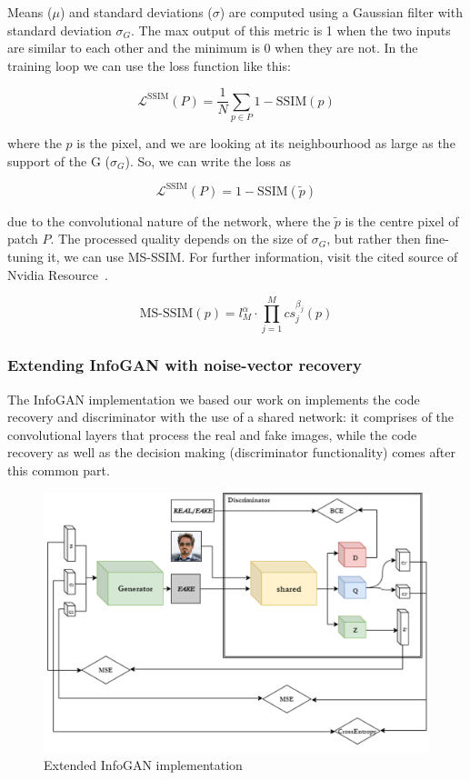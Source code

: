 \documentclass{egpubl}
\begin{document}
Means ($\mu$) and standard deviations ($\sigma$) are computed using a Gaussian filter with standard deviation $\sigma_G$. The max output of this metric is 1 when the two inputs are similar to each other and the minimum is 0 when they are not. In the training loop we can use the loss function like this:

\begin{equation}
\mathcal{L}^{\mathrm{SSIM}}(P) = \frac{1}{N}\sum_{p \in P}1-\mathrm{SSIM}(p)
\end{equation}

where the $p$ is the pixel, and we are looking at its neighbourhood as large as the support of the G ($\sigma_G$). So, we can write the loss as

\begin{equation}
\mathcal{L}^{\mathrm{SSIM}}(P) = 1-\mathrm{SSIM}(\tilde{p})
\end{equation}

due to the convolutional nature of the network, where the $\tilde{p}$ is the centre pixel of patch $P$. 
The processed quality depends on the size of $\sigma_G$, but rather then fine-tuning it, we can use MS-SSIM. For further information, visit the cited source of Nvidia Resource~\cite{zhao2015loss}.

\begin{equation}
\mathrm{MS\mbox{-}SSIM}(p) = l_M^\alpha \cdot \prod_{j=1}^{M}cs_j^{\beta_j}(p)
\end{equation}

\subsubsection{Extending InfoGAN with noise-vector recovery}

The InfoGAN implementation we based our work on implements the code recovery and discriminator with the use of a shared network: it comprises of the convolutional layers that process the real and fake images, while the code recovery as well as the decision making (discriminator functionality) comes after this common part.

\begin{figure}[!htb]
	\centering
	\includegraphics[width=\linewidth]{pic/Infogan_diss_predicting}
	\caption{Extended InfoGAN implementation}
	\label{fig:infogan_simple_noise}
\end{figure}
\end{document}
